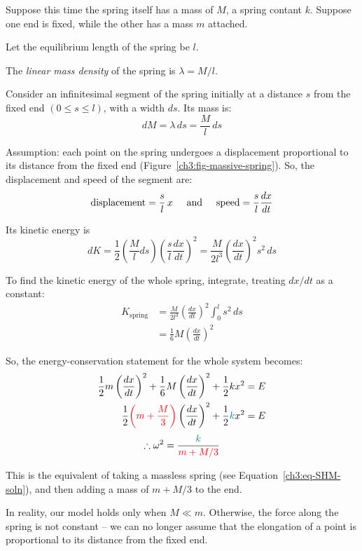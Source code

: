 Suppose this time the spring itself has a mass of $M$, a spring contant $k$. Suppose one end is fixed, while the other has a mass $m$ attached.

Let the equilibrium length of the spring be $l$.

The \emph{linear mass density} of the spring is $ \lambda = {M}/{l} $.

Consider an infinitesimal segment of the spring initially at a distance $s$ from the fixed end $(0 \leq s \leq l)$, with a width $ds$. Its mass is:
\[ dM = \lambda\,ds = \frac{M}{l}\,ds \] 

Assumption: each point on the spring undergoes a displacement proportional to its distance from the fixed end (Figure~\ref{ch3:fig-massive-spring}). So, the displacement and speed of the segment are:
\[ \text{displacement} = \frac{s}{l} \, x \hspace{0.5cm}\text{and}\hspace{0.5cm}
\text{speed} = \frac{s}{l} \frac{dx}{dt} 
\]

Its kinetic energy is \[ dK = \frac{1}{2}\left( \frac{M}{l} ds \right) \left( \frac{s}{l} \frac{dx}{dt} \right)^2 = \frac{M}{2l^3} \left( \frac{dx}{dt} \right)^2 s^2 \, ds \]

To find the kinetic energy of the whole spring, integrate, treating $dx/dt$ as a constant:
\begin{align*}
K_\text{spring} &= \frac{M}{2l^3} \left( \frac{dx}{dt} \right)^2  \int_0^{l} s^2 \, ds \\
&= \frac{1}{6}M\left(\frac{dx}{dt}\right)^2
\end{align*}

So, the energy-conservation statement for the whole system becomes:
\begin{align*}
\frac{1}{2}m\left(\frac{dx}{dt}\right)^2 + \frac{1}{6}M\left( \frac{dx}{dt}\right)^2 + \frac{1}{2}kx^2 &= E  \\
\frac{1}{2} \textcolor{red}{\left( m + \frac{M}{3} \right)} \left(\frac{dx}{dt}\right)^2 + \frac{1}{2} \textcolor{teal}{k} x^2 &= E
\end{align*}
\[ \therefore \omega^2 = \frac{\textcolor{teal}{k}}{\textcolor{red}{m+M/3}} \]

This is the equivalent of taking a massless spring (see Equation~\ref{ch3:eq-SHM-soln}), and then adding a mass of $m + M/3$ to the end.

In reality, our model holds only when $M \ll m$. Otherwise, the force along the spring is not constant -- we can no longer assume that the elongation of a point is proportional to its distance from the fixed end.

